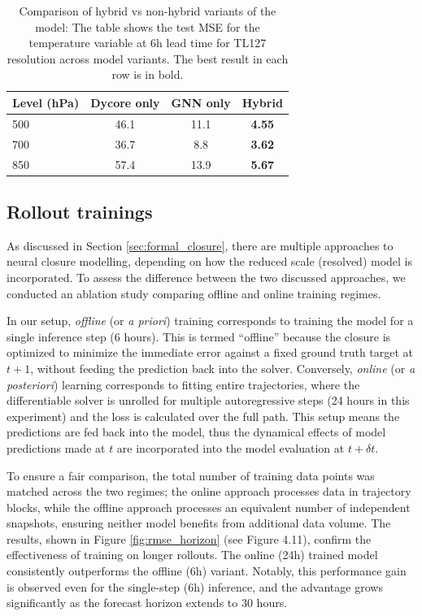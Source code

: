 \begin{table}[ht]
\centering
\small
\begin{tabular}{lccc}
\hline
\textbf{Level (hPa)} & \textbf{Dycore only} & \textbf{GNN only} & \textbf{Hybrid} \\
\hline\hline
500 & 46.1 & 11.1 & \textbf{4.55} \\
700 & 36.7 & 8.8 & \textbf{3.62} \\
850 & 57.4 & 13.9 & \textbf{5.67} \\
\hline
\end{tabular}
\caption{Comparison of hybrid vs non-hybrid variants of the model: The table shows the test MSE for the temperature variable at 6h lead time for TL127 resolution across model variants. The best result in each row is in bold.}
\label{tab:ablation_ml_dycore_only}
\end{table}

\subsection{Rollout trainings}

As discussed in Section \ref{sec:formal_closure}, there are multiple approaches to neural closure modelling, depending on how the reduced scale (resolved) model is incorporated. To assess the difference between the two discussed approaches, we conducted an ablation study comparing offline and online training regimes.

In our setup, \textit{offline} (or \textit{a priori}) training corresponds to training the model for a single inference step (6 hours). This is termed ``offline'' because the closure is optimized to minimize the immediate error against a fixed ground truth target at $t+1$, without feeding the prediction back into the solver. Conversely, \textit{online} (or \textit{a posteriori}) learning corresponds to fitting entire trajectories, where the differentiable solver is unrolled for multiple autoregressive steps (24 hours in this experiment) and the loss is calculated over the full path. This setup means the predictions are fed back into the model, thus the dynamical effects of model predictions made at $t$ are incorporated into the model evaluation at $t+\delta t$.

To ensure a fair comparison, the total number of training data points was matched across the two regimes; the online approach processes data in trajectory blocks, while the offline approach processes an equivalent number of independent snapshots, ensuring neither model benefits from additional data volume. The results, shown in Figure \ref{fig:rmse_horizon} (see Figure 4.11), confirm the effectiveness of training on longer rollouts. The online (24h) trained model consistently outperforms the offline (6h) variant. Notably, this performance gain is observed even for the single-step (6h) inference, and the advantage grows significantly as the forecast horizon extends to 30 hours.


